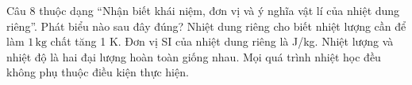\begin{ex}
Câu 8 thuộc dạng “Nhận biết khái niệm, đơn vị và ý nghĩa vật lí của nhiệt dung riêng”. Phát biểu nào sau đây đúng?
\choice
{\True Nhiệt dung riêng cho biết nhiệt lượng cần để làm $1\,\text{kg}$ chất tăng 1 K.}
{Đơn vị SI của nhiệt dung riêng là J/kg.}
{Nhiệt lượng và nhiệt độ là hai đại lượng hoàn toàn giống nhau.}
{Mọi quá trình nhiệt học đều không phụ thuộc điều kiện thực hiện.}
\end{ex}
